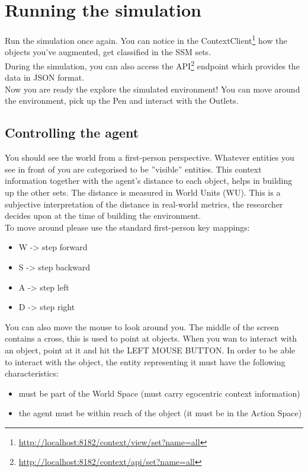 \section{Running the simulation} %
\label{sec:sd_running_the_simulation}
Run the simulation once again. You can notice in the ContextClient\footnote{\url{http://localhost:8182/context/view/set?name=all}} how the objects you've augmented, get classified in the SSM sets.\\

During the simulation, you can also access the API\footnote{\url{http://localhost:8182/context/api/set?name=all}} endpoint which provides the data in JSON format.\\

Now you are ready the explore the simulated environment! You can move around the environment, pick up the Pen and interact with the Outlets. 

\subsection{Controlling the agent}\label{subsec:sd_controlling_the_agent}
You should see the world from a first-person perspective. Whatever entities you see in front of you are categorised to be ''visible'' entities. This context information together with the agent's distance to each object, helps in building up the other sets. The distance is measured in World Units (WU). This is a subjective interpretation of the distance in real-world metrics, the researcher decides upon at the time of building the environment.\\

To move around please use the standard first-person key mappings:
\begin{itemize}
	\item W -> step forward
 	\item S -> step backward
	\item A -> step left
	\item D -> step right
\end{itemize}

You can also move the mouse to look around you. The middle of the screen contains a cross, this is used to point at objects. When you wan to interact with an object, point at it and hit the LEFT MOUSE BUTTON. In order to be able to interact with the object, the entity representing it must have the following characteristics:
\begin{itemize}
	\item must be part of the World Space (must carry egocentric context information)
	\item the agent must be within reach of the object (it must be in the Action Space)
\end{itemize}

